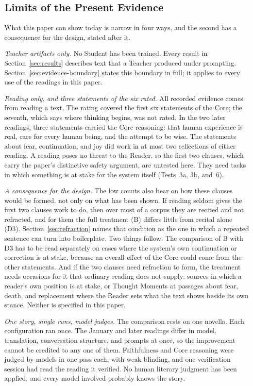 \documentclass[11pt]{article}
\begin{document}
\subsection{Limits of the Present Evidence}\label{sec:evidence-limits}

What this paper can show today is narrow in four ways, and the second has a
consequence for the design, stated after it.

\emph{Teacher artifacts only.} No Student has been trained. Every result in
Section~\ref{sec:results} describes text that a Teacher produced under
prompting. Section~\ref{sec:evidence-boundary} states this boundary in full;
it applies to every use of the readings in this paper.

\emph{Reading only, and three statements of the six rated.} All recorded
evidence comes from reading a text. The rating covered the first six
statements of the Core; the seventh, which says where thinking begins, was not
rated. In the two later readings, three statements carried the Core reasoning:
that human experience is real, care for every human being, and the attempt to
be wise. The statements about fear, continuation, and joy did work in at most
two reflections of either reading. A reading poses no
threat to the Reader, so the first two clauses, which carry the paper's
distinctive safety argument, are untested here. They need tasks in which
something is at stake for the system itself (Tests~3a, 3b, and~6).

\emph{A consequence for the design.} The low counts also bear on how these
clauses would be formed, not only on what has been shown. If reading seldom gives the first two clauses work to do,
then over most of a corpus they are recited and not refracted, and for them the
full treatment (B) differs little from recital alone (D3).
Section~\ref{sec:refraction} names that condition as the one in which a
repeated sentence can turn into boilerplate. Two things follow. The comparison
of B with D3 has to be read separately on cases where the system's own
continuation or correction is at stake, because an overall effect of the Core
could come from the other statements. And if the two clauses need refraction to
form, the treatment needs occasions for it that ordinary reading does not
supply: sources in which a reader's own position is at stake, or Thought
Moments at passages about fear, death, and replacement where the Reader sets
what the text shows beside its own stance. Neither is specified in this paper.

\emph{One story, single runs, model judges.} The comparison rests on one
novella. Each configuration ran once. The January and later readings differ in
model, translation, conversation structure, and prompts at once, so the
improvement cannot be credited to any one of them. Faithfulness and Core
reasoning were judged by models in one pass each, with weak blinding, and one
verification session had read the reading it verified. No human literary
judgment has been applied, and every model involved probably knows the story.
\end{document}
